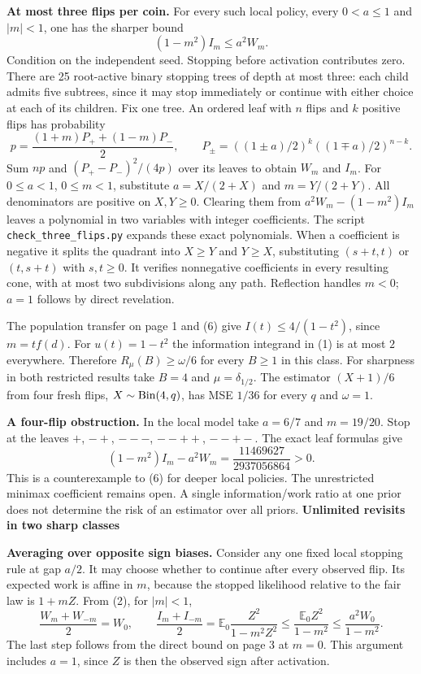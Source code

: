 \documentclass[11pt]{article}
\newcommand{\E}{\mathbb E}
\newcommand{\heading}[1]{{\LARGE\bfseries\color{ink} #1}\par\smallskip}
\begin{document}
\textbf{At most three flips per coin.} For every such local policy, every $0<a\le1$ and $|m|<1$, one has the sharper bound
\[
                 (1-m^2)I_m\le a^2 W_m . \tag{6}
\]
Condition on the independent seed. Stopping before activation contributes zero. There are 25 root-active binary stopping trees of depth at most three: each child admits five subtrees, since it may stop immediately or continue with either choice at each of its children. Fix one tree. An ordered leaf with $n$ flips and $k$ positive flips has probability
\[
 p=\frac{(1+m)P_++(1-m)P_-}{2},\qquad
 P_\pm=((1\pm a)/2)^k((1\mp a)/2)^{n-k}.
\]
Sum $np$ and $(P_+-P_-)^2/(4p)$ over its leaves to obtain $W_m$ and $I_m$. For $0\le a<1$, $0\le m<1$, substitute $a=X/(2+X)$ and $m=Y/(2+Y)$. All denominators are positive on $X,Y\ge0$. Clearing them from $a^2W_m-(1-m^2)I_m$ leaves a polynomial in two variables with integer coefficients. The script \texttt{check\_three\_flips.py} expands these exact polynomials. When a coefficient is negative it splits the quadrant into $X\ge Y$ and $Y\ge X$, substituting $(s+t,t)$ or $(t,s+t)$ with $s,t\ge0$. It verifies nonnegative coefficients in every resulting cone, with at most two subdivisions along any path. Reflection handles $m<0$; $a=1$ follows by direct revelation.

The population transfer on page 1 and (6) give $I(t)\le4/(1-t^2)$, since $m=t f(d)$. For $u(t)=1-t^2$ the information integrand in (1) is at most $2$ everywhere. Therefore $R_\mu(B)\ge\omega/6$ for every $B\ge1$ in this class. For sharpness in both restricted results take $B=4$ and $\mu=\delta_{1/2}$. The estimator $(X+1)/6$ from four fresh flips, $X\sim{\rm Bin}(4,q)$, has MSE $1/36$ for every $q$ and $\omega=1$.

\textbf{A four-flip obstruction.} In the local model take $a=6/7$ and $m=19/20$. Stop at the leaves $+$, $-+$, $---$, $--++$, $--+-$. The exact leaf formulas give
\[
 (1-m^2)I_m-a^2W_m=\frac{11469627}{2937056864}>0 .
\]
This is a counterexample to (6) for deeper local policies. The unrestricted minimax coefficient remains open. A single information/work ratio at one prior does not determine the risk of an estimator over all priors.
\newpage
\heading{Unlimited revisits in two sharp classes}
\textbf{Averaging over opposite sign biases.} Consider any one fixed local stopping rule at gap $a/2$. It may choose whether to continue after every observed flip. Its expected work is affine in $m$, because the stopped likelihood relative to the fair law is $1+mZ$. From (2), for $|m|<1$,
\[
 \frac{W_m+W_{-m}}{2}=W_0,\qquad
 \frac{I_m+I_{-m}}{2}
 =\E_0\frac{Z^2}{1-m^2Z^2}
 \le\frac{\E_0 Z^2}{1-m^2}
 \le\frac{a^2W_0}{1-m^2}.
\]
The last step follows from the direct bound on page 3 at $m=0$. This argument includes $a=1$, since $Z$ is then the observed sign after activation.
\end{document}
